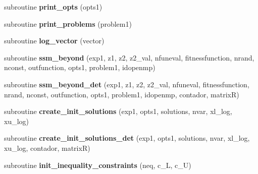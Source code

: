\begin{DoxyCompactItemize}
\item 
\hypertarget{classscattersearchfunctions_a9b773a5853b018bd28a45fa641c8d6f9}{subroutine {\bfseries print\-\_\-opts} (opts1)}\label{classscattersearchfunctions_a9b773a5853b018bd28a45fa641c8d6f9}

\item 
\hypertarget{classscattersearchfunctions_acc2293da2b8fd2df57c526be9b6437cb}{subroutine {\bfseries print\-\_\-problems} (problem1)}\label{classscattersearchfunctions_acc2293da2b8fd2df57c526be9b6437cb}

\item 
\hypertarget{classscattersearchfunctions_a6dc839ba9b0401a21b4fbbfe27938b95}{subroutine {\bfseries log\-\_\-vector} (vector)}\label{classscattersearchfunctions_a6dc839ba9b0401a21b4fbbfe27938b95}

\item 
\hypertarget{classscattersearchfunctions_aded0a4c1802c5063d93a7f5faa8025e8}{subroutine {\bfseries ssm\-\_\-beyond} (exp1, z1, z2, z2\-\_\-val, nfuneval, fitnessfunction, nrand, nconst, outfunction, opts1, problem1, idopenmp)}\label{classscattersearchfunctions_aded0a4c1802c5063d93a7f5faa8025e8}

\item 
\hypertarget{classscattersearchfunctions_aee5f52d21f7487f3d951c9d8b44ee393}{subroutine {\bfseries ssm\-\_\-beyond\-\_\-det} (exp1, z1, z2, z2\-\_\-val, nfuneval, fitnessfunction, nrand, nconst, outfunction, opts1, problem1, idopenmp, contador, matrix\-R)}\label{classscattersearchfunctions_aee5f52d21f7487f3d951c9d8b44ee393}

\item 
\hypertarget{classscattersearchfunctions_a5b9acae6a027f6d538ede1941b1aabde}{subroutine {\bfseries create\-\_\-init\-\_\-solutions} (exp1, opts1, solutions, nvar, xl\-\_\-log, xu\-\_\-log)}\label{classscattersearchfunctions_a5b9acae6a027f6d538ede1941b1aabde}

\item 
\hypertarget{classscattersearchfunctions_a8b32427896096ecea0dd15c81bff8b01}{subroutine {\bfseries create\-\_\-init\-\_\-solutions\-\_\-det} (exp1, opts1, solutions, nvar, xl\-\_\-log, xu\-\_\-log, contador, matrix\-R)}\label{classscattersearchfunctions_a8b32427896096ecea0dd15c81bff8b01}

\item 
\hypertarget{classscattersearchfunctions_abf70a2b066521bd370029f0971377858}{subroutine {\bfseries init\-\_\-inequality\-\_\-constraints} (neq, c\-\_\-\-L, c\-\_\-\-U)}\label{classscattersearchfunctions_abf70a2b066521bd370029f0971377858}


\end{DoxyCompactItemize}
